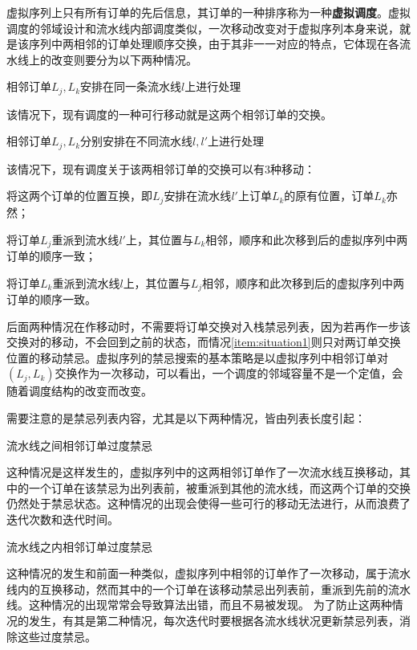 虚拟序列上只有所有订单的先后信息，其订单的一种排序称为一种\textbf{虚拟调度}。虚拟调度的邻域设计和流水线内部调度类似，一次移动改变对于虚拟序列本身来说，就是该序列中两相邻的订单处理顺序交换，由于其非一一对应的特点，它体现在各流水线上的改变则要分为以下两种情况。
\begin{asparaenum}
\item 相邻订单$L_j, L_k$安排在同一条流水线$l$上进行处理

该情况下，现有调度的一种可行移动就是这两个相邻订单的交换。
\item 相邻订单$L_j, L_k$分别安排在不同流水线$l, l'$上进行处理
\end{asparaenum}

该情况下，现有调度关于该两相邻订单的交换可以有$3$种移动：
\begin{inparaenum}
\renewcommand{\theenumi}{\protect\setcounter{local}{171 + \the\value{enumi}}\protect\ding{\value{local}}}
\renewcommand{\labelenumi}{\theenumi}
\item 将这两个订单的位置互换，即$L_j$安排在流水线$l'$上订单$L_k$的原有位置，订单$L_k$亦然\label{item:situation1}；
\item 将订单$L_j$重派到流水线$l'$上，其位置与$L_k$相邻，顺序和此次移到后的虚拟序列中两订单的顺序一致；
\item 将订单$L_k$重派到流水线$l$上，其位置与$L_j$相邻，顺序和此次移到后的虚拟序列中两订单的顺序一致。
\end{inparaenum}

后面两种情况在作移动时，不需要将订单交换对入栈禁忌列表，因为若再作一步该交换对的移动，不会回到之前的状态，而情况\ref{item:situation1}则只对两订单交换位置的移动禁忌。虚拟序列的禁忌搜索的基本策略是以虚拟序列中相邻订单对$(L_j, L_k)$交换作为一次移动，可以看出，一个调度的邻域容量不是一个定值，会随着调度结构的改变而改变。

需要注意的是禁忌列表内容，尤其是以下两种情况，皆由列表长度引起：
\begin{asparaenum}
\item 流水线之间相邻订单过度禁忌

这种情况是这样发生的，虚拟序列中的这两相邻订单作了一次流水线互换移动，其中的一个订单在该禁忌为出列表前，被重派到其他的流水线，而这两个订单的交换仍然处于禁忌状态。这种情况的出现会使得一些可行的移动无法进行，从而浪费了迭代次数和迭代时间。
\item 流水线之内相邻订单过度禁忌
\end{asparaenum}
这种情况的发生和前面一种类似，虚拟序列中相邻的订单作了一次移动，属于流水线内的互换移动，然而其中的一个订单在该移动禁忌出列表前，重派到先前的流水线。这种情况的出现常常会导致算法出错，而且不易被发现。
为了防止这两种情况的发生，有其是第二种情况，每次迭代时要根据各流水线状况更新禁忌列表，消除这些过度禁忌。

